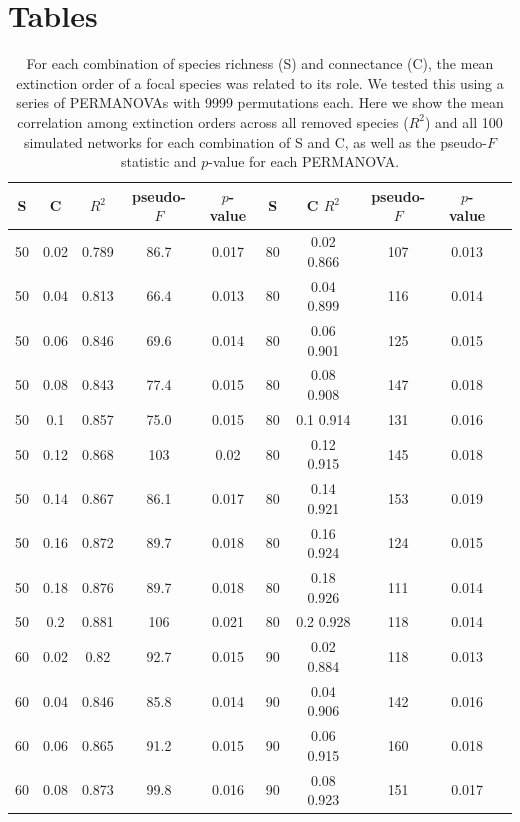 \documentclass[12pt]{article}
\begin{document}
     


\section{Tables}


	\begin{table}[h!]
		\caption{For each combination of species richness (S) and connectance (C), the mean extinction order of a focal species was related to its role. We tested this using a series of PERMANOVAs with 9999 permutations each. Here we show the mean correlation among extinction orders across all removed species ($R^2$) and all 100 simulated networks for each combination of S and C, as well as the pseudo-$F$ statistic and $p$-value for each PERMANOVA.}
		\label{permtable}
		\begin{tabular}{c c | c | c c ||c c | c | c c |}
			S	&	C	&	$R^2$	&	pseudo-$F$	&	$p$-value	&	S	&	C	$R^2$	&	pseudo-$F$	&	$p$-value\\ 
			\hline
			50	&	0.02	&	0.789	&	86.7	&	0.017	&	80	&	0.02	0.866	&	107	&	0.013\\ 
			50	&	0.04	&	0.813	&	66.4	&	0.013	&	80	&	0.04	0.899	&	116	&	0.014\\ 
			50	&	0.06	&	0.846	&	69.6	&	0.014	&	80	&	0.06	0.901	&	125	&	0.015\\ 
			50	&	0.08	&	0.843	&	77.4	&	0.015	&	80	&	0.08	0.908	&	147	&	0.018\\ 
			50	&	0.1	&	0.857	&	75.0	&	0.015	&	80	&	0.1	0.914	&	131	&	0.016\\ 
			50	&	0.12	&	0.868	&	103	&	0.02	&	80	&	0.12	0.915	&	145	&	0.018\\ 
			50	&	0.14	&	0.867	&	86.1	&	0.017	&	80	&	0.14	0.921	&	153	&	0.019\\ 
			50	&	0.16	&	0.872	&	89.7	&	0.018	&	80	&	0.16	0.924	&	124	&	0.015\\ 
			50	&	0.18	&	0.876	&	89.7	&	0.018	&	80	&	0.18	0.926	&	111	&	0.014\\ 
			50	&	0.2	&	0.881	&	106	&	0.021	&	80	&	0.2	0.928	&	118	&	0.014\\ 
			60	&	0.02	&	0.82	&	92.7	&	0.015	&	90	&	0.02	0.884	&	118	&	0.013\\ 
			60	&	0.04	&	0.846	&	85.8	&	0.014	&	90	&	0.04	0.906	&	142	&	0.016\\ 
			60	&	0.06	&	0.865	&	91.2	&	0.015	&	90	&	0.06	0.915	&	160	&	0.018\\ 
			60	&	0.08	&	0.873	&	99.8	&	0.016	&	90	&	0.08	0.923	&	151	&	0.017\\ 

\end{tabular}
\end{table}
\end{document}
